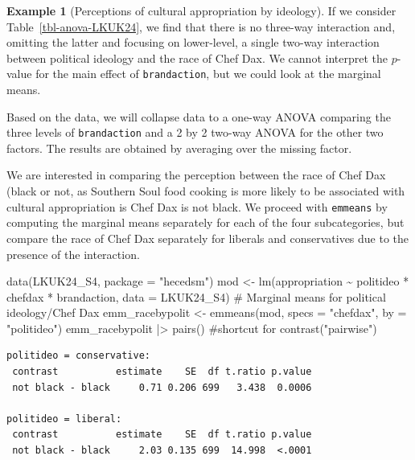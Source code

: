 \documentclass[
  11pt,
  letterpaper,
]{scrbook}
\newenvironment{Shaded}{\begin{snugshade}}{\end{snugshade}}
\newcommand{\AttributeTok}[1]{\textcolor[rgb]{0.40,0.45,0.13}{#1}}
\newcommand{\CommentTok}[1]{\textcolor[rgb]{0.37,0.37,0.37}{#1}}
\newcommand{\FunctionTok}[1]{\textcolor[rgb]{0.28,0.35,0.67}{#1}}
\newcommand{\NormalTok}[1]{\textcolor[rgb]{0.00,0.23,0.31}{#1}}
\newcommand{\OtherTok}[1]{\textcolor[rgb]{0.00,0.23,0.31}{#1}}
\newcommand{\SpecialCharTok}[1]{\textcolor[rgb]{0.37,0.37,0.37}{#1}}
\newcommand{\StringTok}[1]{\textcolor[rgb]{0.13,0.47,0.30}{#1}}
\theoremstyle{definition}
\newtheorem{example}{Example}[chapter]
\theoremstyle{remark}
\begin{document}
\begin{example}[Perceptions of cultural appropriation by
ideology]
If we consider Table~\ref{tbl-anova-LKUK24}, we find that there is no
three-way interaction and, omitting the latter and focusing on
lower-level, a single two-way interaction between political ideology and
the race of Chef Dax. We cannot interpret the \(p\)-value for the main
effect of \texttt{brandaction}, but we could look at the marginal means.

Based on the data, we will collapse data to a one-way ANOVA comparing
the three levels of \texttt{brandaction} and a 2 by 2 two-way ANOVA for
the other two factors. The results are obtained by averaging over the
missing factor.

We are interested in comparing the perception between the race of Chef
Dax (black or not, as Southern Soul food cooking is more likely to be
associated with cultural appropriation is Chef Dax is not black. We
proceed with \texttt{emmeans} by computing the marginal means separately
for each of the four subcategories, but compare the race of Chef Dax
separately for liberals and conservatives due to the presence of the
interaction.

\begin{Shaded}
\begin{Highlighting}[]
\FunctionTok{data}\NormalTok{(LKUK24\_S4, }\AttributeTok{package =} \StringTok{"hecedsm"}\NormalTok{)}
\NormalTok{mod }\OtherTok{\textless{}{-}} \FunctionTok{lm}\NormalTok{(appropriation }\SpecialCharTok{\textasciitilde{}}\NormalTok{ politideo }\SpecialCharTok{*}\NormalTok{ chefdax }\SpecialCharTok{*}\NormalTok{ brandaction,}
   \AttributeTok{data =}\NormalTok{ LKUK24\_S4)}
\CommentTok{\# Marginal means for political ideology/Chef Dax}
\NormalTok{emm\_racebypolit }\OtherTok{\textless{}{-}} \FunctionTok{emmeans}\NormalTok{(mod, }\AttributeTok{specs =} \StringTok{"chefdax"}\NormalTok{, }\AttributeTok{by =} \StringTok{"politideo"}\NormalTok{)}
\NormalTok{emm\_racebypolit }\SpecialCharTok{|\textgreater{}} \FunctionTok{pairs}\NormalTok{() }\CommentTok{\#shortcut for contrast("pairwise")}
\end{Highlighting}
\end{Shaded}

\begin{verbatim}
politideo = conservative:
 contrast          estimate    SE  df t.ratio p.value
 not black - black     0.71 0.206 699   3.438  0.0006

politideo = liberal:
 contrast          estimate    SE  df t.ratio p.value
 not black - black     2.03 0.135 699  14.998  <.0001


\end{verbatim}
\end{example}
\end{document}
